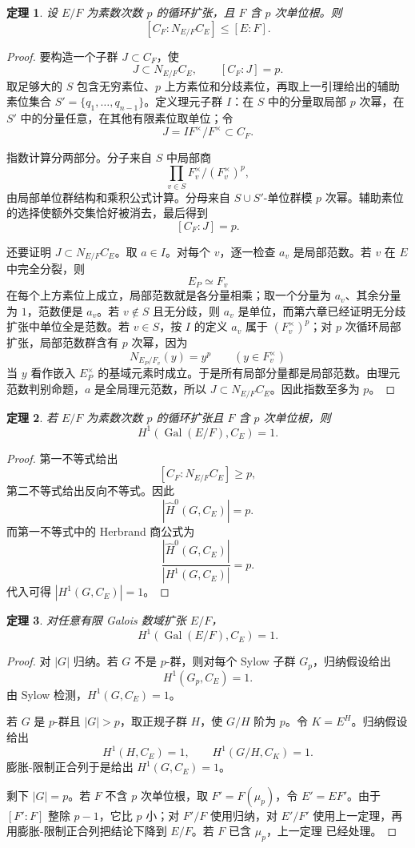 \documentclass[11pt,a4paper,openany]{ctexbook}
\numberwithin{equation}{chapter}
\newcommand{\Gal}{\operatorname{Gal}}
\theoremstyle{plain}
\newtheorem{theorem}{定理}[chapter]
\theoremstyle{definition}
\theoremstyle{remark}
\begin{document}
\begin{theorem}
设 $E/F$ 为素数次数 $p$ 的循环扩张，且 $F$ 含 $p$ 次单位根。则
\[
[C_F:N_{E/F}C_E]\le [E:F].
\]
\end{theorem}

\begin{proof}
要构造一个子群 $J\subset C_F$，使
\[
J\subset N_{E/F}C_E,\qquad [C_F:J]=p.
\]
取足够大的 $S$ 包含无穷素位、$p$ 上方素位和分歧素位，再取上一引理给出的辅助素位集合 $S'=\{q_1,\dots,q_{n-1}\}$。定义理元子群 $I$：在 $S$ 中的分量取局部 $p$ 次幂，在 $S'$ 中的分量任意，在其他有限素位取单位；令
\[
J=IF^\times/F^\times\subset C_F.
\]

指数计算分两部分。分子来自 $S$ 中局部商
\[
\prod_{v\in S}F_v^\times/(F_v^\times)^p,
\]
由局部单位群结构和乘积公式计算。分母来自 $S\cup S'$-单位群模 $p$ 次幂。辅助素位的选择使额外交集恰好被消去，最后得到
\[
[C_F:J]=p.
\]

还要证明 $J\subset N_{E/F}C_E$。取 $a\in I$。对每个 $v$，逐一检查 $a_v$ 是局部范数。若 $v$ 在 $E$ 中完全分裂，则
\[
E_P\simeq F_v
\]
在每个上方素位上成立，局部范数就是各分量相乘；取一个分量为 $a_v$、其余分量为 $1$，范数便是 $a_v$。若 $v\notin S$ 且无分歧，则 $a_v$ 是单位，而第六章已经证明无分歧扩张中单位全是范数。若 $v\in S$，按 $I$ 的定义 $a_v$ 属于 $(F_v^\times)^p$；对 $p$ 次循环局部扩张，局部范数群含有 $p$ 次幂，因为
\[
N_{E_P/F_v}(y)=y^p\qquad(y\in F_v^\times)
\]
当 $y$ 看作嵌入 $E_P^\times$ 的基域元素时成立。于是所有局部分量都是局部范数。由理元范数判别命题，$a$ 是全局理元范数，所以 $J\subset N_{E/F}C_E$。因此指数至多为 $p$。
\end{proof}

\begin{theorem}
若 $E/F$ 为素数次数 $p$ 的循环扩张且 $F$ 含 $p$ 次单位根，则
\[
H^1(\Gal(E/F),C_E)=1.
\]
\end{theorem}

\begin{proof}
第一不等式给出
\[
[C_F:N_{E/F}C_E]\ge p,
\]
第二不等式给出反向不等式。因此
\[
|\widehat H^0(G,C_E)|=p.
\]
而第一不等式中的 Herbrand 商公式为
\[
\frac{|\widehat H^0(G,C_E)|}{|H^1(G,C_E)|}=p.
\]
代入可得 $|H^1(G,C_E)|=1$。
\end{proof}

\begin{theorem}
对任意有限 Galois 数域扩张 $E/F$，
\[
H^1(\Gal(E/F),C_E)=1.
\]
\end{theorem}

\begin{proof}
对 $|G|$ 归纳。若 $G$ 不是 $p$-群，则对每个 Sylow 子群 $G_p$，归纳假设给出
\[
H^1(G_p,C_E)=1.
\]
由 Sylow 检测，$H^1(G,C_E)=1$。

若 $G$ 是 $p$-群且 $|G|>p$，取正规子群 $H$，使 $G/H$ 阶为 $p$。令 $K=E^H$。归纳假设给出
\[
H^1(H,C_E)=1,\qquad H^1(G/H,C_K)=1.
\]
膨胀-限制正合列于是给出 $H^1(G,C_E)=1$。

剩下 $|G|=p$。若 $F$ 不含 $p$ 次单位根，取 $F'=F(\mu_p)$，令 $E'=EF'$。由于 $[F':F]$ 整除 $p-1$，它比 $p$ 小；对 $F'/F$ 使用归纳，对 $E'/F'$ 使用上一定理，再用膨胀-限制正合列把结论下降到 $E/F$。若 $F$ 已含 $\mu_p$，上一定理 已经处理。
\end{proof}
\end{document}
